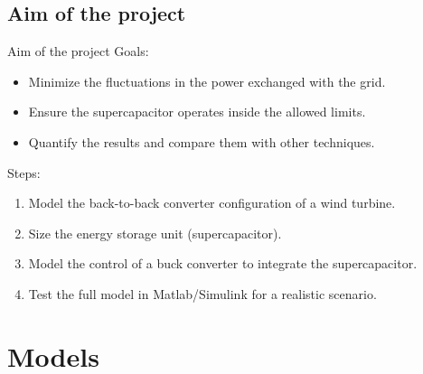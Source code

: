\subsection{Aim of the project}
\begin{frame}{Aim of the project}
  Goals:
  \begin{itemize}
    \item Minimize the fluctuations in the power exchanged with the grid.
    \item Ensure the supercapacitor operates inside the allowed limits.
    \item Quantify the results and compare them with other techniques.
  \end{itemize}

  Steps:
  \begin{enumerate}
    \item Model the back-to-back converter configuration of a wind turbine.
    \item Size the energy storage unit (supercapacitor).
    \item Model the control of a buck converter to integrate the supercapacitor.
    \item Test the full model in Matlab/Simulink for a realistic scenario.
  \end{enumerate}
\end{frame}


\section{Models}
